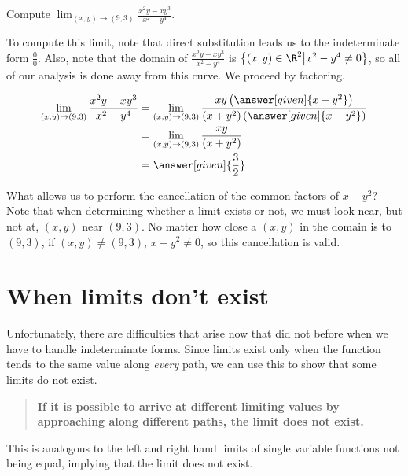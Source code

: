 \documentclass{ximera}
\newcommand{\point}[1]{\left(#1\right)} %
\begin{document}
\begin{example}
  Compute $\lim_{\point{x,y}\to\point{9,3}} \frac{x^2y-xy^3}{x^2-y^4}$. 
  \begin{explanation}
   To compute this limit, note that direct substitution leads us to the indeterminate form $\frac{0}{0}$.  Also, note that the domain of $ \frac{x^2y-xy^3}{x^2-y^4}$ is $\left\{\point{x,y} \in \R^2 \big| x^2-y^4 \neq 0 \right\}$, so all of our analysis is done away from this curve.  We proceed by factoring.
    
    \begin{align*}
      \lim_{\point{x,y}\to\point{9,3}} \frac{x^2y-xy^3}{x^2-y^4}
      &=\lim_{\point{x,y}\to\point{9,3}} \frac{xy\left(\answer[given]{x-y^2}\right)}{(x+y^2)\left(\answer[given]{x-y^2}\right)}\\
      &=\lim_{\point{x,y}\to\point{9,3}} \frac{xy}{(x+y^2)}\\
      &=\answer[given]{\frac{3}{2}}
    \end{align*}
    
    What allows us to perform the cancellation of the common factors of $x-y^2$?  Note that when determining whether a limit exists or not, we must look near, but not at, $\point{x,y}$ near $\point{9,3}$.  No matter how close a $\point{x,y}$ in the domain is to $\point{9,3}$, if $\point{x,y} \neq \point{9,3}$, $x-y^2 \neq 0$, so this cancellation is valid.
  \end{explanation}
\end{example}


\section{When limits don't exist}
Unfortunately, there are difficulties that arise now that did not before when we have to handle indeterminate forms.  Since limits exist only when the function tends to the same value along \emph{every} path, we can use this to show that some limits do not exist.  

\begin{quote}
  \textbf{If it is possible to arrive at different limiting values by
    approaching along different paths, the limit does not exist.}
\end{quote}

This is analogous to the left and right hand limits of single variable
functions not being equal, implying that the limit does not exist.
 
\end{document}
